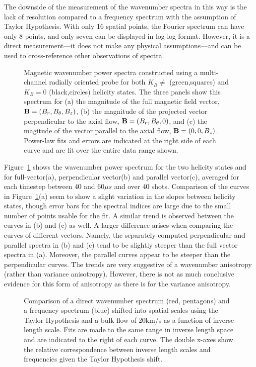 \documentclass[manuscript]{aastex}
\begin{document}
The downside of the measurement of the wavenumber spectra in this way is the lack of resolution compared to a frequency spectrum with the assumption of Taylor Hypothesis. With only 16 spatial points, the Fourier spectrum can have only 8 points, and only seven can be displayed in log-log format. However, it is a direct measurement---it does not make any physical assumptions---and can be used to cross-reference other observations of spectra.

\begin{figure}
\caption{\label{fig:wavenumber_spectra} Magnetic wavenumber power spectra constructed using a multi-channel radially oriented probe for both $K_{B}\neq$ (green,squares) and $K_{B}=0$ (black,circles) helicity states. The three panels show this spectrum for (a) the magnitude of the full magnetic field vector, ${\bf B} = (B_{r},B_{\theta},B_{z})$, (b) the magnitude of the projected vector perpendicular to the axial flow, ${\bf B} = (B_{r},B_{\theta},0)$, and (c) the magitude of the vector parallel to the axial flow, ${\bf B} = (0,0,B_{z})$. Power-law fits and errors are indicated at the right side of each curve and are fit over the entire data range shown.}
\end{figure}

Figure~\ref{fig:wavenumber_spectra} shows the wavenumber power spectrum for the two helicity states and for full-vector(a), perpendicular vector(b) and parallel vector(c), averaged for each timestep between 40 and 60$\mu s$ and over 40 shots. Comparison of the curves in Figure~\ref{fig:wavenumber_spectra}(a) seem to show a slight variation in the slopes between helicity states, though error bars for the spectral indices are large due to the small number of points usable for the fit. A similar trend is observed between the curves in (b) and (c) as well. A larger difference arises when comparing the curves of different vectors. Namely, the separately computed perpendicular and parallel spectra in (b) and (c) tend to be slightly steeper than the full vector spectra in (a). Moreover, the parallel curves appear to be steeper than the perpendicular curves. The trends are very suggestive of a wavenumber anisotropy (rather than variance anisotropy). However, there is not as much conclusive evidence for this form of anisotropy as there is for the variance anisotropy.

\begin{figure}
\caption{\label{fig:wavenumber_comp} Comparison of a direct wavenumber spectrum (red, pentagons) and a frequency spectrum (blue) shifted into spatial scales using the Taylor Hypothesis and a bulk flow of 20km/s as a function of inverse length scale. Fits are made to the same range in inverse length space and are indicated to the right of each curve. The double x-axes show the relative correspondence between inverse length scales and frequencies given the Taylor Hypothesis shift.}
\end{figure}
\end{document}

